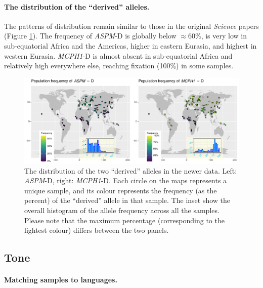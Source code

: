 \documentclass[twoside,onecolumn]{article}
\begin{document}
\paragraph{The distribution of the ``derived'' alleles.}

The patterns of distribution remain similar to those in the original \textit{Science} papers (Figure \ref{Fig:gene_maps}).
The frequency of \textit{ASPM}-D is globally below $\approx 60\%$, is very low in sub-equatorial Africa and the Americas, higher in eastern Eurasia, and highest in western Eurasia.
\textit{MCPH1}-D is almost absent in sub-equatorial Africa and relatively high everywhere else, reaching fixation (100\%) in some samples.

\begin{figure}[h]
  \centering
	\includegraphics[width=\textwidth]{../../code/figures/map_alleles}
	\caption{The distribution of the two ``derived'' alleles in the newer data. Left: \textit{ASPM}-D, right: \textit{MCPH1}-D. Each circle on the maps represents a unique sample, and its colour represents the frequency (as the percent) of the ``derived'' allele in that sample. The inset show the overall histogram of the allele frequency across all the samples. Please note that the maximum percentage (corresponding to the lightest colour) differs between the two panels.}
	\label{Fig:gene_maps}
\end{figure}


\subsection{Tone}

\paragraph{Matching samples to languages.}
\end{document}
